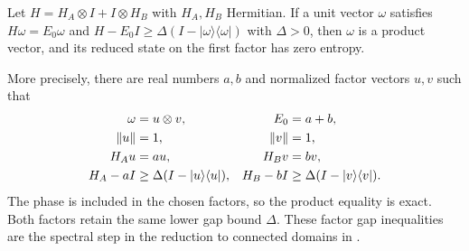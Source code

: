 \begin{theorem}
    \label{thm:area_law_product_ground_state}
    Let $H=H_A\otimes I+I\otimes H_B$ with $H_A,H_B$ Hermitian. If a unit
    vector $\omega$ satisfies $H\omega=E_0\omega$ and
    $H-E_0I\ge\Delta(I-|\omega\rangle\langle\omega|)$ with $\Delta>0$, then
    $\omega$ is a product vector, and its reduced state on the first factor has
    zero entropy.

    More precisely, there are real numbers $a,b$ and normalized factor
    vectors $u,v$ such that
    \begin{align}
        \omega & =u\otimes v,                            & E_0   & =a+b,\notag \\
        \|u\|  & =1,                                     & \|v\| & =1,\notag   \\
        H_Au   & =au,                                    & H_Bv  & =bv,\notag  \\
        H_A-aI & \ge\Delta(I-|u\rangle\langle u|),       &
        H_B-bI & \ge\Delta(I-|v\rangle\langle v|).\notag
    \end{align}
    The phase is included in the chosen factors, so the product equality
    is exact. Both factors retain the same lower gap bound $\Delta$.
    These factor gap inequalities are the spectral step in the reduction
    to connected domains in \cite[Part~I]{TNLean2026OneDimensional}.
\end{theorem}

